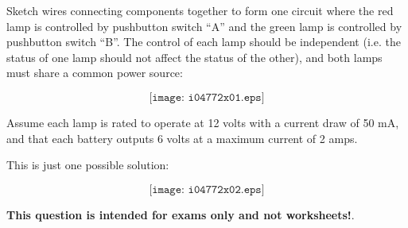 

Sketch wires connecting components together to form one circuit where the red lamp is controlled by pushbutton switch ``A'' and the green lamp is controlled by pushbutton switch ``B''.  The control of each lamp should be independent (i.e. the status of one lamp should not affect the status of the other), and both lamps must share a common power source:

$$\texttt{[image: i04772x01.eps]}$$

Assume each lamp is rated to operate at 12 volts with a current draw of 50 mA, and that each battery outputs 6 volts at a maximum current of 2 amps.







This is just one possible solution:

$$\texttt{[image: i04772x02.eps]}$$
 






{\bf This question is intended for exams only and not worksheets!}.



